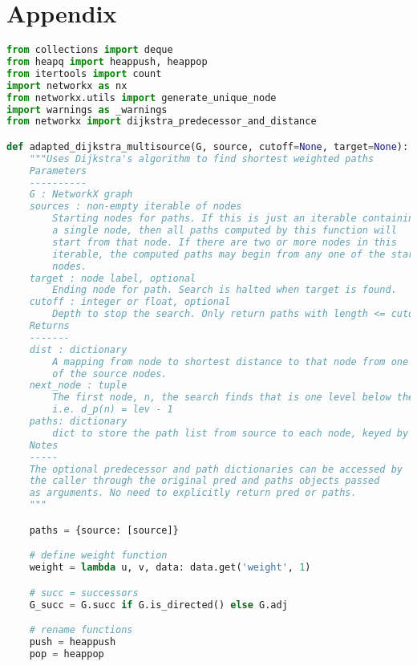 \chapter{Appendix}
\begingroup
\fontsize{9pt}{12pt}\selectfont

\begin{lstlisting}[language=Python]
from collections import deque
from heapq import heappush, heappop
from itertools import count
import networkx as nx
from networkx.utils import generate_unique_node
import warnings as _warnings
from networkx import dijkstra_predecessor_and_distance

def adapted_dijkstra_multisource(G, source, cutoff=None, target=None):
    """Uses Dijkstra's algorithm to find shortest weighted paths
    Parameters
    ----------
    G : NetworkX graph
    sources : non-empty iterable of nodes
        Starting nodes for paths. If this is just an iterable containing
        a single node, then all paths computed by this function will
        start from that node. If there are two or more nodes in this
        iterable, the computed paths may begin from any one of the start
        nodes.
    target : node label, optional
        Ending node for path. Search is halted when target is found.
    cutoff : integer or float, optional
        Depth to stop the search. Only return paths with length <= cutoff.
    Returns
    -------
    dist : dictionary
        A mapping from node to shortest distance to that node from one
        of the source nodes.
    next_node : tuple
        The first node, n, the search finds that is one level below the current node
        i.e. d_p(n) = lev - 1
    paths: dictionary
        dict to store the path list from source to each node, keyed by node.
    Notes
    -----
    The optional predecessor and path dictionaries can be accessed by
    the caller through the original pred and paths objects passed
    as arguments. No need to explicitly return pred or paths.
    """

    paths = {source: [source]}

    # define weight function
    weight = lambda u, v, data: data.get('weight', 1)

    # succ = successors
    G_succ = G.succ if G.is_directed() else G.adj

    # rename functions
    push = heappush
    pop = heappop


\end{lstlisting}
